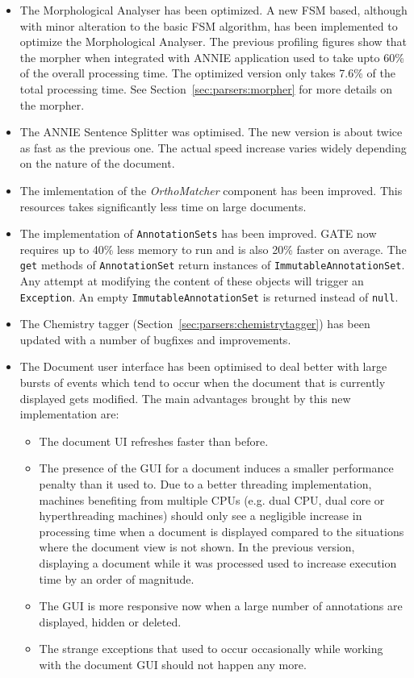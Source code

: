 \begin{itemize}
\item The Morphological Analyser has been optimized.  A new FSM based, although
  with minor alteration to the basic FSM algorithm, has been implemented to
  optimize the Morphological Analyser. The previous profiling figures show
  that the morpher when integrated with ANNIE application used to take upto
  60\% of the overall processing time.  The optimized version only takes 7.6\%
  of the total processing time. See Section~\ref{sec:parsers:morpher} for
  more details on the morpher.

\item The ANNIE Sentence Splitter was optimised. The new version is about twice
  as fast as the previous one. The actual speed increase varies widely
  depending on the nature of the document.

\item The imlementation of the \textit{OrthoMatcher} component has been
  improved.  This resources takes significantly less time on large documents.

\item The implementation of \texttt{AnnotationSets} has been improved. GATE now
  requires up to 40\% less memory to run and is also 20\% faster on average.
  The \texttt{get} methods of \texttt{AnnotationSet} return instances of
  \texttt{ImmutableAnnotationSet}. Any attempt at modifying the content of
  these objects will trigger an \texttt{Exception}. An empty
  \texttt{ImmutableAnnotationSet} is returned instead of \texttt{null}.

\item The Chemistry tagger (Section~\ref{sec:parsers:chemistrytagger}) has
  been updated with a number of bugfixes and improvements.

\item The Document user interface has been optimised to deal better with large
bursts of events which tend to occur when the document that is currently
displayed gets modified. The main advantages brought by this new implementation
are:
\begin{itemize}
  \item The document UI refreshes faster than before.
  \item The presence of the GUI for a document induces a smaller performance
  penalty than it used to. Due to a better threading implementation, machines
  benefiting from multiple CPUs (e.g. dual CPU, dual core or hyperthreading
  machines) should only see a negligible increase in processing time when a
  document is displayed compared to the situations where the document view is
  not shown. In the previous version, displaying a document while it was
  processed used to increase execution time by an order of magnitude.
  \item The GUI is more responsive now when a large number of annotations are
  displayed, hidden or deleted.
  \item The strange exceptions that used to occur occasionally while working
  with the document GUI should not happen any more.
\end{itemize}

\end{itemize}
